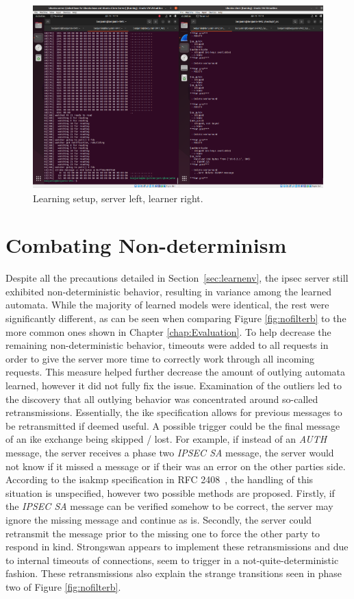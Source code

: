 \begin{figure}
	\centering
	\includegraphics[width=\linewidth]{images/VM_setup}
	\caption{Learning setup, server left, learner right.}
	\label{fig:vmsetup}
\end{figure}

\section{Combating Non-determinism} \label{subsec:nondet}
Despite all the precautions detailed in Section~\ref{sec:learnenv}, the \ac{ipsec} server still exhibited non-deterministic behavior, resulting in variance among the learned automata. While the majority of learned models were identical, the rest were significantly different, as can be seen when comparing Figure \ref{fig:nofilterb} to the more common ones shown in Chapter \ref{chap:Evaluation}. To help decrease the remaining non-deterministic behavior, timeouts were added to all requests in order to give the server more time to correctly work through all incoming requests. This measure helped further decrease the amount of outlying automata learned, however it did not fully fix the issue. Examination of the outliers led to the discovery that all outlying behavior was concentrated around so-called retransmissions. Essentially, the \ac{ike} specification allows for previous messages to be retransmitted if deemed useful. A possible trigger could be the final message of an \ac{ike} exchange being skipped / lost. For example, if instead of an \emph{AUTH} message, the server receives a phase two \emph{IPSEC SA} message, the server would not know if it missed a message or if their was an error on the other parties side. According to the \ac{isakmp} specification in RFC 2408~\parencite{rfc2408}, the handling of this situation is unspecified, however two possible methods are proposed. Firstly, if the \emph{IPSEC SA} message can be verified somehow to be correct, the server may ignore the missing message and continue as is. Secondly, the server could retransmit the message prior to the missing one to force the other party to respond in kind. Strongswan appears to implement these retransmissions and due to internal timeouts of connections, seem to trigger in a not-quite-deterministic fashion. These retransmissions also explain the strange transitions seen in phase two of Figure \ref{fig:nofilterb}. 

